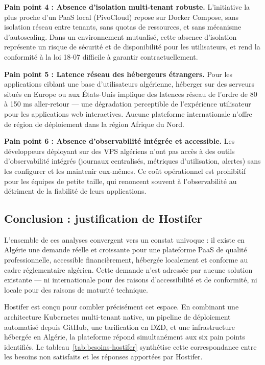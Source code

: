 \textbf{Pain point 4 : Absence d'isolation multi-tenant robuste.} L'initiative la plus proche d'un PaaS local (PivoCloud) repose sur Docker Compose, sans isolation réseau entre tenants, sans quotas de ressources, et sans mécanisme d'autoscaling. Dans un environnement mutualisé, cette absence d'isolation représente un risque de sécurité et de disponibilité pour les utilisateurs, et rend la conformité à la loi 18-07 difficile à garantir contractuellement.

\textbf{Pain point 5 : Latence réseau des hébergeurs étrangers.} Pour les applications ciblant une base d'utilisateurs algérienne, héberger sur des serveurs situés en Europe ou aux États-Unis implique des latences réseau de l'ordre de 80 à 150 ms aller-retour — une dégradation perceptible de l'expérience utilisateur pour les applications web interactives. Aucune plateforme internationale n'offre de région de déploiement dans la région Afrique du Nord.

\textbf{Pain point 6 : Absence d'observabilité intégrée et accessible.} Les développeurs déployant sur des VPS algériens n'ont pas accès à des outils d'observabilité intégrés (journaux centralisés, métriques d'utilisation, alertes) sans les configurer et les maintenir eux-mêmes. Ce coût opérationnel est prohibitif pour les équipes de petite taille, qui renoncent souvent à l'observabilité au détriment de la fiabilité de leurs applications.

\subsection*{Conclusion : justification de Hostifer}

L'ensemble de ces analyses convergent vers un constat univoque : il existe en Algérie une demande réelle et croissante pour une plateforme PaaS de qualité professionnelle, accessible financièrement, hébergée localement et conforme au cadre réglementaire algérien. Cette demande n'est adressée par aucune solution existante — ni internationale pour des raisons d'accessibilité et de conformité, ni locale pour des raisons de maturité technique.

Hostifer est conçu pour combler précisément cet espace. En combinant une architecture Kubernetes multi-tenant native, un pipeline de déploiement automatisé depuis GitHub, une tarification en DZD, et une infrastructure hébergée en Algérie, la plateforme répond simultanément aux six pain points identifiés. Le tableau~\ref{tab:besoins-hostifer} synthétise cette correspondance entre les besoins non satisfaits et les réponses apportées par Hostifer.

